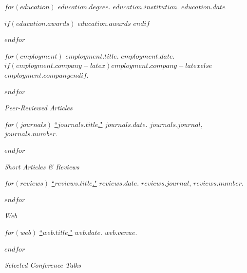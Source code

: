 \documentclass[11pt,article,oneside]{memoir}
\begin{document}
\medskip

\reversemarginpar

\bigskip


$for(education)$
\ind $education.degree$. $education.institution$. $education.date$

$if(education.awards)$
\ind \hspace{0.35in} \footnotesize $education.awards$ \normalsize \vspace{0.05in}
$endif$

\smallskip
$endfor$

\bigskip


$for(employment)$
\ind $employment.title$. $employment.date$. $if(employment.company-latex)$$employment.company-latex$$else$$employment.company$$endif$.

\smallskip
$endfor$

\bigskip
\pagebreak[1]


\ind \emph{Peer-Reviewed Articles}

\smallskip

$for(journals)$
\ind \href{$journals.url$}{``$journals.title$."} $journals.date$. \emph{$journals.journal$}, $journals.number$.

\smallskip
$endfor$
\medskip

\ind \emph{Short Articles \& Reviews}

\smallskip

$for(reviews)$
\ind \href{$reviews.url$}{``$reviews.title$."} $reviews.date$. \emph{$reviews.journal$}, $reviews.number$.

\smallskip
$endfor$
\medskip

\ind \emph{Web}

\smallskip

$for(web)$
\ind \href{$web.url$}{``$web.title$."} $web.date$. \emph{$web.venue$}. 

\smallskip
$endfor$

\bigskip
\pagebreak[1]


\ind \emph{Selected Conference Talks}
\end{document}
